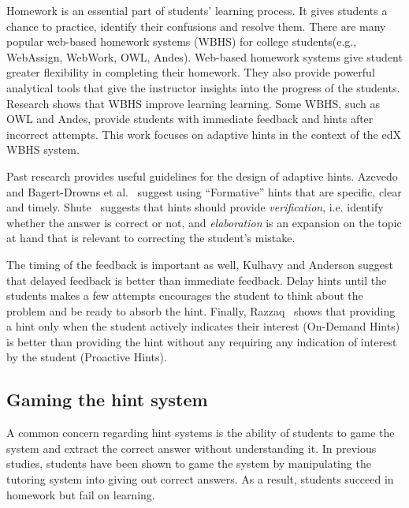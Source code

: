 \documentclass{llncs2e/llncs}
\begin{document}
Homework is an essential part of students' learning
process\cite{Cooper2006}. It gives students a chance to practice,
identify their confusions and resolve them. There are many popular
web-based homework systems (WBHS) for college students(e.g.,
WebAssign, WebWork, OWL, Andes). Web-based homework systems give
student greater flexibility in completing their homework. They also
provide powerful analytical tools that give the instructor insights
into the progress of the students. Research shows that WBHS improve
learning learning\cite{MestHartRath2002}\cite{Vanlehn2005}. Some WBHS,
such as OWL and Andes, provide students with immediate feedback and
hints after incorrect
attempts\cite{MestHartRath2002}\cite{Vanlehn2005}. This work focuses
on adaptive hints in the context of the edX WBHS system.

Past research provides useful guidelines for the design of adaptive
hints.  Azevedo~\cite{Azevedo1995} and Bagert-Drowns et
al.~\cite{Bangert-Drowns1991} suggest using ``Formative'' hints that
are specific, clear and timely. Shute~\cite{Shute2008} suggests that
hints should provide {\em verification}, i.e. identify whether the
answer is correct or not, and {\em elaboration} is an expansion on the
topic at hand that is relevant to correcting the student's mistake.

The timing of the feedback is important as well, Kulhavy and
Anderson\cite{Kulhavy1972} suggest that delayed feedback is better
than immediate feedback.  Delay hints until the students makes a few
attempts encourages the student to think about the problem and be
ready to absorb the hint.  Finally, Razzaq~\cite{Razzaq2010} shows
that providing a hint only when the student actively indicates their
interest (On-Demand Hints) is better than providing the hint without
any requiring any indication of interest by the student (Proactive
Hints).


\subsection*{Gaming the hint system}

A common concern regarding hint systems is the ability of students to game the system and extract the correct answer without understanding it\cite{Baker2004}\cite{Baker2005}. In previous studies, students have been shown to game the system by manipulating the tutoring system into giving out correct answers\cite{Baker2004Off-task}. As a result, students succeed in homework but fail on learning.
\end{document}
